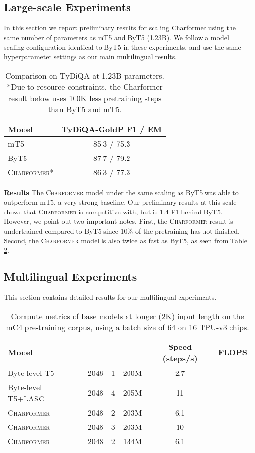 \documentclass{article} \usepackage{iclr2022_conference,times}
\newcommand{\charformer}{\textsc{Charformer}\xspace}
\newcommand{\charformerbase}{\textsc{Charformer}\xspace}
\newcommand{\charformertall}{\textsc{Charformer}\xspace}
\newcommand{\bytebase}{Byte-level T5\xspace}
\newcommand{\caninebase}{Byte-level T5+LASC\xspace}
\begin{document}
\subsection{Large-scale Experiments}

In this section we report preliminary results for scaling Charformer using the same number of parameters as mT5 and ByT5 (1.23B). We follow a model scaling configuration identical to ByT5 in these experiments, and use the same hyperparameter settings as our main multilingual results.
\begin{table}[H]
\small
    \centering
    \caption{Comparison on TyDiQA at 1.23B parameters. *Due to resource constraints, the Charformer result below uses 100K less pretraining steps than ByT5 and mT5.}
    \begin{tabular}{l c}
    \toprule
     Model & TyDiQA-GoldP F1 / EM\\
     \midrule
     mT5 & 85.3 / 75.3 \\
     ByT5 & 87.7 / 79.2 \\
     \textsc{Charformer}* & 86.3 / 77.3 \\
     \bottomrule
    \end{tabular}
    \label{tab:tydids}
\end{table}

\noindent \textbf{Results}  The \charformer model under the same scaling as ByT5 was able to outperform mT5, a very strong baseline. Our preliminary results at this scale shows that \charformer is competitive with, but is 1.4 F1 behind ByT5. However, we point out two important notes. First, the \charformer result is undertrained compared to ByT5 since 10\% of the pretraining has not finished. Second, the \charformer model is also twice as fast as ByT5, as seen from Table \ref{tab:perf-mc4}.

\subsection{Multilingual Experiments}
This section contains detailed results for our multilingual experiments.

\begin{table}[H]
    \small
    \centering
    \caption{Compute metrics of base models at longer (2K) input length on the mC4 pre-training corpus, using a batch size of 64 on 16 TPU-v3 chips.}
    \label{tab:perf-mc4}
    \begin{tabular}{l c c ccc}
    \toprule 
    Model &  &  &   & Speed (steps/s) & FLOPS \\
    \midrule
    \bytebase & 2048 & 1 & 200M& 2.7 &   \\
    \caninebase & 2048 & 4 & 205M& 11 & \\
    \charformerbase & 2048  & 2 & 203M & 6.1  & \\
    \charformerbase & 2048  & 3 & 203M & 10 & \\
    \charformertall & 2048 & 2 & 134M & 6.1 & \\
    \bottomrule
    \end{tabular}
\end{table}
\end{document}
